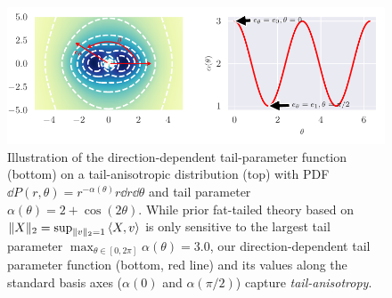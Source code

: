 \documentclass[twoside]{article}
\theoremstyle{definition}
\newtheorem{definition}[theorem]{Definition}
\theoremstyle{remark}
\begin{document}
\begin{figure}[htbp]
  \centering
  \includegraphics{../Figures/radial-fat-tail.pdf}%
  \vspace{-3mm}
  \caption{
    Illustration of the direction-dependent tail-parameter function (bottom) on a tail-anisotropic distribution (top)
    with PDF $\dd P(r,\theta) = r^{-\alpha(\theta)} r \dd r \dd\theta$ and tail parameter $\alpha(\theta) = 2 + \cos(2\theta)$.
    While prior fat-tailed theory based on $\|X\|_2 = \sup_{\|v\|_2 = 1} \braket{X,v}$
    is only sensitive to the largest tail parameter $\max_{\theta \in [0, 2\pi]} \alpha(\theta) = 3.0$,
    our direction-dependent tail parameter function (bottom, red line)
    and its values along the standard basis axes ($\alpha(0)$ and $\alpha(\pi/2)$)
    capture \emph{tail-anisotropy}.
  }
  \label{fig:radial-fat-tail}
\end{figure}


\end{document}
